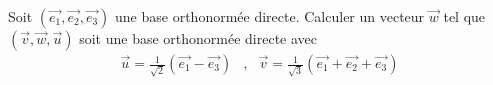 Soit $(\overrightarrow{e_1},\overrightarrow{e_2},\overrightarrow{e_3})$ une base orthonorm\'ee directe. Calculer un vecteur $\overrightarrow{w}$ tel que $(\overrightarrow{v},\overrightarrow{w},\overrightarrow{u})$ soit une base orthonorm\'ee directe avec
\begin{align*}
 \overrightarrow{u}=\frac{1}{\sqrt{2}}(\overrightarrow{e_1}-\overrightarrow{e_3}) &,& 
 \overrightarrow{v}=\frac{1}{\sqrt{3}}(\overrightarrow{e_1}+\overrightarrow{e_2}+\overrightarrow{e_3})
\end{align*}
\medskip
